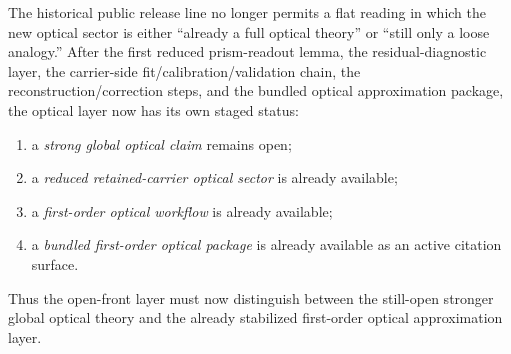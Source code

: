 \begin{remark}
\label{rem:v323-synchronized-status-reading-for-the-optical-approximation-layer}
The historical public  release line no longer permits a flat reading in which the new optical sector is either ``already a full optical theory'' or ``still only a loose analogy.'' After the first reduced prism-readout lemma, the residual-diagnostic layer, the carrier-side fit/calibration/validation chain, the reconstruction/correction steps, and the bundled optical approximation package, the optical layer now has its own staged status:
\begin{enumerate}[leftmargin=2em,label=(\roman*)]
 \item a \emph{strong global optical claim} remains open;
 \item a \emph{reduced retained-carrier optical sector} is already available;
 \item a \emph{first-order optical workflow} is already available;
 \item a \emph{bundled first-order optical package} is already available as an active citation surface.
\end{enumerate}
Thus the open-front layer must now distinguish between the still-open stronger global optical theory and the already stabilized first-order optical approximation layer.
\end{remark}

